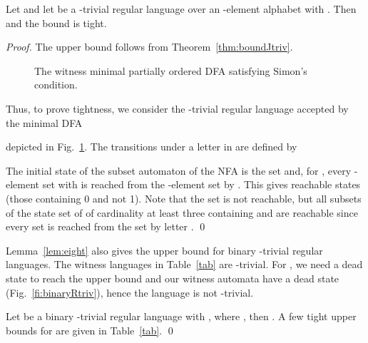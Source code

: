 \documentclass[runningheads]{llncs}
\newcommand{\J}{}
\begin{document}
  \begin{theorem}\label{thm3}
    Let  and let  be a \J-trivial regular language
    over an -element alphabet with  .
    Then  and the bound is tight.
  \end{theorem}
  \begin{proof}
    The upper bound follows from Theorem~\ref{thm:boundJtriv}.
    \begin{figure}[t]
      \centering
      \caption{The witness minimal partially ordered DFA  satisfying Simon's condition.}
      \label{fig:n2witness}
    \end{figure}
    Thus, to prove tightness, we consider 
    the \J-trivial regular language accepted by the minimal DFA 
    
    depicted in Fig.~\ref{fig:n2witness}.
    The transitions under a letter  in  are defined by
    
    The initial state of the subset automaton of the NFA  is the set  and, for , 
    every -element set  
    with  
    is reached from the -element set  by .
    This gives  reachable states (those containing 0 and not 1).
    Note that the set  is not reachable,
    but all subsets of the state set of  of cardinality at least three containing  and 
    are reachable
    since every set  is reached from the set
     by letter .
    \qed
  \end{proof}

  Lemma~\ref{lem:eight} also gives the upper bound for binary \J-trivial regular languages. The witness languages in Table~\ref{tab} are \J-trivial. For , we need a dead state to reach the upper bound  and our witness automata have a dead state (Fig.~\ref{fi:binaryRtriv}), hence the language is not \J-trivial.
  \begin{corollary}
    Let  be a binary \J-trivial regular language with , 
    where , then . 
    A few tight upper bounds for  are given in Table~\ref{tab}.
    \qed
  \end{corollary}
  
\end{document}
